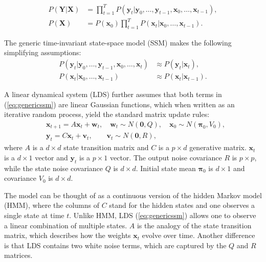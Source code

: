 \documentclass[times,twocolumn,final,authoryear]{elsarticle}
\providecommand{\mb}[1]{\boldsymbol{#1}}
\newcommand{\bx}{\mb{x}}
\newcommand{\by}{\mb{y}}
\newcommand{\bX}{\mb{X}}
\newcommand{\bY}{\mb{Y}}
\let\oldref\ref
\renewcommand{\ref}[1]{(\oldref{#1})}
\begin{document}
\begin{equation*}
\begin{aligned}
P(\mb{Y}|\mb{X}) &= \prod_{t=1}^T P(\by_t | \by_0,\ldots,\by_{t-1}, \bx_0,\ldots,\bx_{t-1}), \\
P(\bX) &= P(\bx_0) \prod_{t=1}^T P(\bx_t | \bx_0,\ldots,\bx_{t-1}).
\end{aligned}
\end{equation*}

The generic time-invariant state-space model (SSM) makes the following simplifying assumptions:
\begin{equation}
\label{eq:genericssm}
\begin{aligned}
P(\by_t | \by_0,\ldots,\by_{t-1}, \bx_0,\ldots,\bx_t)  &\approx P(\by_t | \bx_t), \\
P(\bx_t | \bx_0,\ldots,\bx_{t-1}) &\approx P(\bx_t | \bx_{t-1}).
\end{aligned}
\end{equation}

A linear dynamical system (LDS) further assumes that both terms in \ref{eq:genericssm} are linear Gaussian functions, which when written as an iterative random process, yield the standard matrix update rules:
\begin{equation*}
\begin{aligned}
&\bx_{t+1}=A\bx_t+\mathbf{w}_t, \quad \mathbf{w}_t\sim N(\mathbf{0},Q),\quad \bx_0 \sim N(\mathbf{\pi}_0,V_0), \\
&\by_t=C\bx_t+\mathbf{v}_t,\qquad \mathbf{v}_t\sim N(\mathbf{0},R),
\end{aligned}
\end{equation*}
where $A$ is a $d\times d$ state transition matrix and $C$ is a $p \times d$ generative matrix. $\bx_t$ is a $d\times 1$ vector and $\by_t$ is a $p\times 1$ vector.
The output noise covariance $R$ is $p\times p$, while the state noise covariance $Q$ is $d\times d$. Initial state mean $\mathbf{\pi}_0$ is $d\times 1$ and covariance $V_0$ is $d \times d$.

The model can be thought of as a continuous version of the hidden Markov model (HMM), where the columns of $C$ stand for the hidden states and one observes a single state at time $t$. Unlike HMM, LDS \ref{eq:genericssm} allows one to observe a linear combination of multiple states. $A$ is the analogy of the state transition matrix, which describes how the weights $\bx_t$ evolve over time. Another difference is that LDS contains two white noise terms, which are captured by the $Q$ and $R$ matrices.
\end{document}
